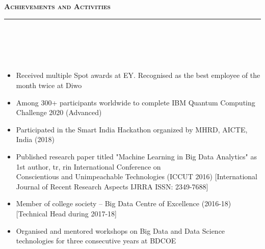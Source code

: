 \documentclass[a4paper,10pt]{article}
\newcommand{\isep}{-2 pt}
\newcommand{\lsep}{-0.5cm}
\newcommand{\resheading}[1]{{\small
        {
            \begin{minipage}
                {0.992\textwidth}\textbf{{\textsc{#1 \vphantom{p\^{E}} }}}
                \\[-0.3cm]
                \hrule
            \end{minipage}
            \\[-0.5cm]
        }
 }}
\begin{document}
\vspace{2pt}
\noindent
\resheading{\textbf{\large Achievements and Activities}}\\[\lsep] 
\\[-0.3cm]
\begin{itemize}\itemsep \isep

\item Received multiple Spot awards at EY. Recognised as the best employee of the month twice at Diwo

\item Among 300+ participants worldwide to complete IBM Quantum Computing Challenge 2020 (Advanced)

\item Participated in the Smart India Hackathon organized by MHRD, AICTE, India (2018)

\item Published research paper titled "Machine Learning in Big Data Analytics" as 1st author, tr, rin International Conference on \\
Conscientious and Unimpeachable Technologies (ICCUT 2016) [International Journal of Recent Research Aspects IJRRA ISSN: 2349-7688]


\item Member of college society -- Big Data Centre of Excellence (2016-18) [Technical Head during  2017-18]

\item Organised and mentored workshops on Big Data and Data Science technologies for three consecutive years at BDCOE





    
	
\end{itemize}
\end{document}
